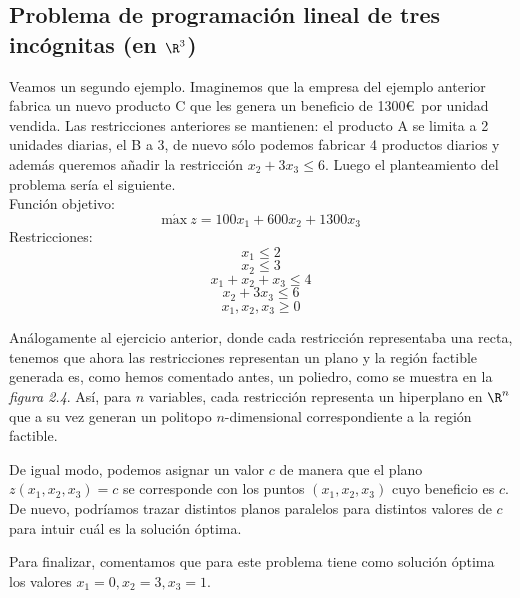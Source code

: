 \subsection{Problema de programación lineal de tres incógnitas (en $\R^3$)}
\begin{ejem} Veamos un segundo ejemplo. Imaginemos que la empresa del ejemplo anterior fabrica un nuevo producto C que les genera un beneficio de 1300\euro\ por unidad vendida. Las restricciones anteriores se mantienen: el producto A se limita a 2 unidades diarias, el B a 3, de nuevo sólo podemos fabricar 4 productos diarios y además queremos añadir la restricción $x_2+3x_3\leq 6$. Luego el planteamiento del problema sería el siguiente.\\
Función objetivo:
\[\mathrm{m\acute{a}x}\ z = 100x_1 + 600x_2+1300x_3\]
Restricciones:
\[x_1\leq 2\]
\[x_2\leq 3\]
\[x_1+x_2+x_3\leq 4\]
\[x_2+3x_3\leq 6\]
\[x_1,x_2,x_3\geq 0\]

Análogamente al ejercicio anterior, donde cada restricción representaba una recta, tenemos que ahora las restricciones representan un plano y la región factible generada es, como hemos comentado antes, un poliedro, como se muestra en la \textit{figura 2.4}. Así, para $n$ variables, cada restricción representa un hiperplano en $\R^n$ que a su vez generan un politopo $n$-dimensional correspondiente a la región factible.

De igual modo, podemos asignar un valor $c$ de manera que el plano $z(x_1,x_2,x_3)=c$ se corresponde con los puntos $(x_1,x_2,x_3)$ cuyo beneficio es $c$. De nuevo, podríamos trazar distintos planos paralelos para distintos valores de $c$ para intuir cuál es la solución óptima.

Para finalizar, comentamos que para este problema tiene como solución óptima los valores $x_1=0,x_2=3,x_3=1$.
\begin{figura}\ \begin{center} \end{center} \end{figura}
\end{ejem}